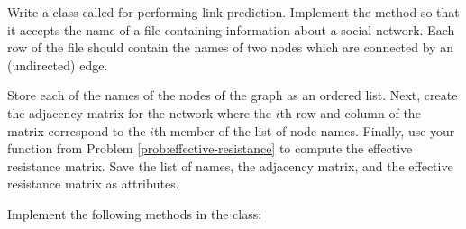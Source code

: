 Write a class called  for performing link prediction.
Implement the  method so that it accepts the name of a  file containing information about a social network.
Each row of the file should contain the names of two nodes which are connected by an (undirected) edge.

Store each of the names of the nodes of the graph as an ordered list.
Next, create the adjacency matrix for the network where the $i$th row and column of the matrix correspond to the $i$th member of the list of node names.
Finally, use your function from Problem \ref{prob:effective-resistance} to compute the effective resistance matrix.
Save the list of names, the adjacency matrix, and the effective resistance matrix as attributes.

Implement the following methods in the  class:

